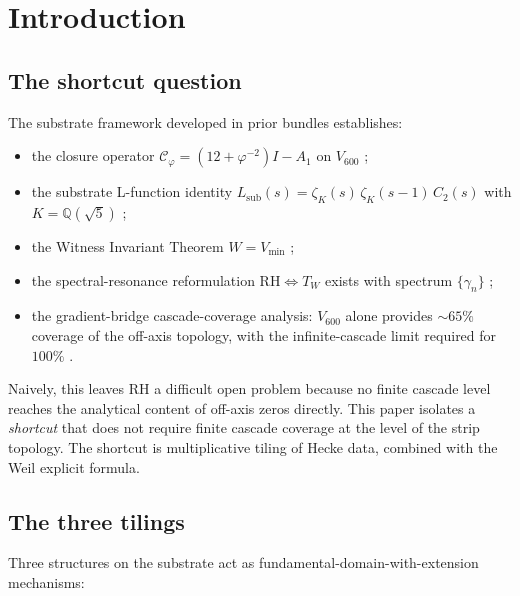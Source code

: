 \documentclass[11pt,a4paper]{article}
\theoremstyle{definition}
\newcommand{\Q}{\mathbb{Q}}
\newcommand{\sub}{\mathrm{sub}}
\newcommand{\Vmin}{V_{\min}}
\newcommand{\Cphi}{\mathcal{C}_{\!\varphi}}
\begin{document}
\section{Introduction}

\subsection{The shortcut question}
The substrate framework developed in prior bundles establishes:
\begin{itemize}
\item the closure operator $\Cphi = (12+\varphi^{-2})I - A_1$ on $V_{600}$
      \cite{IcosianTriad};
\item the substrate L-function identity $L_\sub(s) = \zeta_K(s)\,\zeta_K(s-1)\,C_2(s)$
      with $K=\Q(\sqrt{5})$ \cite{CriticalLinePullback};
\item the Witness Invariant Theorem $W = \Vmin$ \cite{ObserverAttractor};
\item the spectral-resonance reformulation $\mathrm{RH}\Leftrightarrow T_W$
      exists with spectrum $\{\gamma_n\}$ \cite{RHWitnessResonance};
\item the gradient-bridge cascade-coverage analysis: $V_{600}$ alone provides
      $\sim\!65\%$ coverage of the off-axis topology, with the infinite-cascade
      limit required for $100\%$ \cite{GradientBridge}.
\end{itemize}
Naively, this leaves RH a difficult open problem because no finite cascade level
reaches the analytical content of off-axis zeros directly. This paper isolates a
\emph{shortcut} that does not require finite cascade coverage at the level of
the strip topology. The shortcut is multiplicative tiling of Hecke data,
combined with the Weil explicit formula.

\subsection{The three tilings}
Three structures on the substrate act as fundamental-domain-with-extension
mechanisms:
\end{document}
